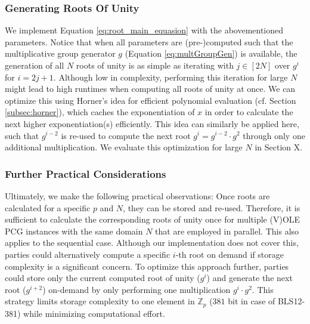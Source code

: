 \subsubsection{Generating Roots Of Unity}
We implement Equation \ref{eq:root_main_equasion} with the abovementioned parameters. Notice that when all parameters are (pre-)computed such that the multiplicative group generator $g$ (Equation \ref{eq:multGroupGen}) is available, the generation of all $N$ roots of unity is as simple as iterating with $j\in[2N]$ over $g^i$ for $i=2j+1$. Although low in complexity, performing this iteration for large $N$ might lead to high runtimes when computing all roots of unity at once. We can optimize this using Horner's idea for efficient polynomial evaluation (cf. Section \ref{subsec:horner}), which caches the exponentiation of $x$ in order to calculate the next higher exponentiation(s) efficiently. This idea can similarly be applied here, such that $g^{i-2}$ is re-used to compute the next root $g^i= g^{i-2}\cdot g^2$ through only one additional multiplication. We evaluate this optimization for large $N$ in Section \todo X.

\subsubsection{Further Practical Considerations}
Ultimately, we make the following practical observations: Once roots are calculated for a specific $p$ and $N$, they can be stored and re-used. Therefore, it is sufficient to calculate the corresponding roots of unity once for multiple (V)OLE PCG instances with the same domain $N$ that are employed in parallel. This also applies to the sequential case. Although our implementation does not cover this, parties could alternatively compute a specific $i$-th root on demand if storage complexity is a significant concern. To optimize this approach further, parties could store only the current computed root of unity ($g^i$) and generate the next root ($g^{i+2}$) on-demand by only performing one multiplication $g^i\cdot g^2$. This strategy limits storage complexity to one element in $\mathbb{Z}_p$ ($381$ bit in case of BLS12-381) while minimizing computational effort. 